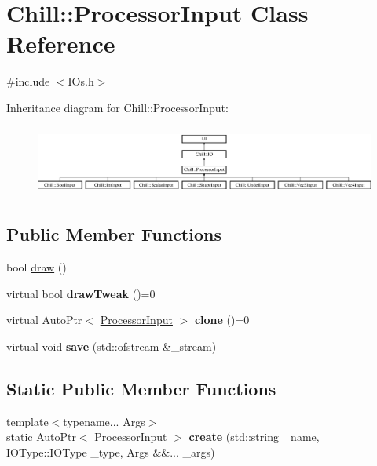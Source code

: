 \hypertarget{class_chill_1_1_processor_input}{}\section{Chill\+:\+:Processor\+Input Class Reference}
\label{class_chill_1_1_processor_input}


{\ttfamily \#include $<$I\+Os.\+h$>$}

Inheritance diagram for Chill\+:\+:Processor\+Input\+:\begin{figure}[H]
\begin{center}
\leavevmode
\includegraphics[height=2.352941cm]{class_chill_1_1_processor_input}
\end{center}
\end{figure}
\subsection*{Public Member Functions}
\begin{DoxyCompactItemize}
\item 
bool \mbox{\hyperlink{class_chill_1_1_processor_input_a0dfb7b669e95248d3a5974b7800aeb66}{draw}} ()
\item 
\mbox{\label{class_chill_1_1_processor_input_ae44f1b889636b33518cdc92ee47ac3d5}} 
virtual bool {\bfseries draw\+Tweak} ()=0
\item 
\mbox{\label{class_chill_1_1_processor_input_afb41f8ac5e195001b6b2236701844320}} 
virtual Auto\+Ptr$<$ \mbox{\hyperlink{class_chill_1_1_processor_input}{Processor\+Input}} $>$ {\bfseries clone} ()=0
\item 
\mbox{\label{class_chill_1_1_processor_input_a1db7672498f9af5f0f85afa0e7889cc8}} 
virtual void {\bfseries save} (std\+::ofstream \&\+\_\+stream)
\end{DoxyCompactItemize}
\subsection*{Static Public Member Functions}
\begin{DoxyCompactItemize}
\item 
\mbox{\label{class_chill_1_1_processor_input_af0f82db3d6d093cbb93ab0e4eedf7bbf}} 
{\footnotesize template$<$typename... Args$>$ }\\static Auto\+Ptr$<$ \mbox{\hyperlink{class_chill_1_1_processor_input}{Processor\+Input}} $>$ {\bfseries create} (std\+::string \+\_\+name, I\+O\+Type\+::\+I\+O\+Type \+\_\+type, Args \&\&... \+\_\+args)
\end{DoxyCompactItemize}
